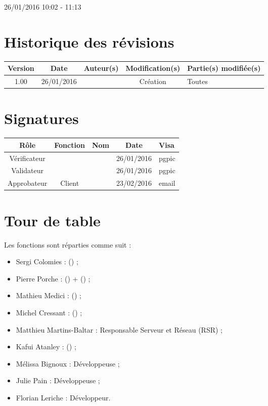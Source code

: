 \documentclass [a4paper] {article}
\begin{document}
26/01/2016			 				%
\hfill   
\hfill 	 10:02 - 11:13 				%


\section*{Historique des révisions}
\begin{center}
			\begin{tabular}{| c | c | c | c | p{4cm} |}
				\hline
				\rowcolor{Gray}
				Version & Date & Auteur(s) & Modification(s) & Partie(s) modifiée(s)		 \\
				\hline
				1.00 & 26/01/2016 & \Pierre & Création & Toutes \\
		\hline		
			\end{tabular}
		\end{center}

\section*{Signatures}

		\begin{center}
			\begin{tabular}{| c | c | c | c | p{4cm} |}
				\hline
				\rowcolor{Gray}
				Rôle & Fonction & Nom & Date & Visa		 \\
				\hline
				Vérificateur & \RQA & \Kafui & 26/01/2016 & pgpic \\[30pt]
				\hline
				Validateur & \CP & \Sergi & 26/01/2016 & pgpic \\[30pt]	
				\hline
				Approbateur & Client & \nomClient & 23/02/2016 & email \\[30pt]	
				\hline
			\end{tabular}
		\end{center}


\section{Tour de table}
Les fonctions sont réparties comme suit :
\begin{itemize}
	\item Sergi Colomies : \CP (\CPCourt) ;
	\item Pierre Porche : \RQ (\RQCourt) + \CPA (\CPACourt) ;
	\item Mathieu Medici : \RGC (\RGCCourt) ;
	\item Michel Cressant : \RD (\RDCourt) ;
	\item Matthieu Martins-Baltar : Responsable Serveur et Réseau (RSR) ;
	\item Kafui Atanley : \RQA (\RQACourt) ;
	\item Mélissa Bignoux : Développeuse ;
	\item Julie Pain : Développeuse ;
	\item Florian Leriche : Développeur.


\end{itemize}
\end{document}
